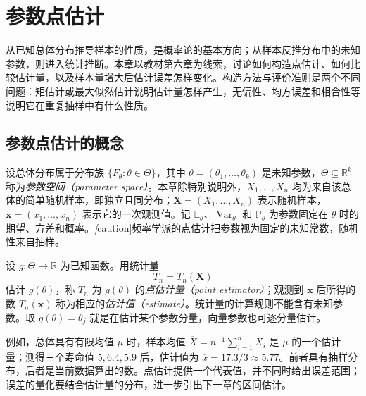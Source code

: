 \setcounter{chapter}{5} %
\chapter{参数点估计}
\label{chap:study-point-estimation}

从已知总体分布推导样本的性质，是概率论的基本方向；从样本反推分布中的未知参数，则进入统计推断。本章以教材第六章为线索，讨论如何构造点估计、如何比较估计量，以及样本量增大后估计误差怎样变化。构造方法与评价准则是两个不同问题：矩估计或最大似然估计说明估计量怎样产生，无偏性、均方误差和相合性等说明它在重复抽样中有什么性质。

\section{参数点估计的概念}
\label{sec:study-point-estimation-concept}

设总体分布属于分布族 $\{F_\theta:\theta\in\Theta\}$，其中 $\theta=(\theta_1,\ldots,\theta_k)$ 是未知参数，$\Theta\subseteq\mathbb R^k$ 称为\emph{参数空间（parameter space）}。本章除特别说明外，$X_1,\ldots,X_n$ 均为来自该总体的简单随机样本，即独立且同分布；$\boldsymbol X=(X_1,\ldots,X_n)$ 表示随机样本，$\boldsymbol x=(x_1,\ldots,x_n)$ 表示它的一次观测值。记 $\mathbb E_\theta$、$\operatorname{Var}_\theta$ 和 $\mathbb P_\theta$ 为参数固定在 $\theta$ 时的期望、方差和概率。\emph[caution]{频率学派的点估计把参数视为固定的未知常数，随机性来自抽样。}

\begin{definition}[点估计量与估计值]
\label{def:study-point-estimator}
设 $g:\Theta\to\mathbb R$ 为已知函数。用统计量
\[
  T_n=T_n(\boldsymbol X)
\]
估计 $g(\theta)$，称 $T_n$ 为 $g(\theta)$ 的\emph{点估计量（point estimator）}；观测到 $\boldsymbol x$ 后所得的数 $T_n(\boldsymbol x)$ 称为相应的\emph{估计值（estimate）}。统计量的计算规则不能含有未知参数。取 $g(\theta)=\theta_j$ 就是在估计某个参数分量，向量参数也可逐分量估计。
\end{definition}

例如，总体具有有限均值 $\mu$ 时，样本均值 $\overline X=n^{-1}\sum_{i=1}^nX_i$ 是 $\mu$ 的一个估计量；测得三个寿命值 $5,6.4,5.9$ 后，估计值为 $\overline x=17.3/3\approx5.77$。前者具有抽样分布，后者是当前数据算出的数。点估计提供一个代表值，并不同时给出误差范围；误差的量化要结合估计量的分布，进一步引出下一章的区间估计。


